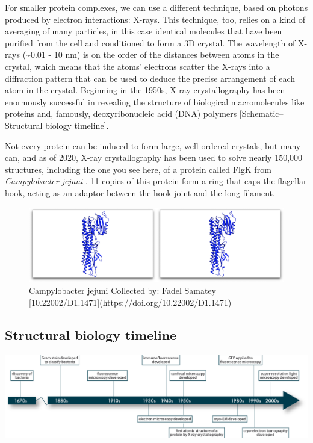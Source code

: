 \documentclass[]{tufte-book}
\begin{document}
For smaller protein complexes, we can use a different technique, based
on photons produced by electron interactions: X-rays. This technique,
too, relies on a kind of averaging of many particles, in this case
identical molecules that have been purified from the cell and
conditioned to form a 3D crystal. The wavelength of X-rays
(\textasciitilde{}0.01 - 10 nm) is on the order of the distances between
atoms in the crystal, which means that the atoms' electrons scatter the
X-rays into a diffraction pattern that can be used to deduce the precise
arrangement of each atom in the crystal. Beginning in the 1950s, X-ray
crystallography has been enormously successful in revealing the
structure of biological macromolecules like proteins and, famously,
deoxyribonucleic acid (DNA) polymers {[}Schematic--Structural biology
timeline{]}.

Not every protein can be induced to form large, well-ordered crystals,
but many can, and as of 2020, X-ray crystallography has been used to
solve nearly 150,000 structures, including the one you see here, of a
protein called FlgK from \emph{Campylobacter jejuni}
\citet{bulieris2017}. 11 copies of this protein form a ring that caps
the flagellar hook, acting as an adaptor between the hook joint and the
long filament.

\begin{figure}
\includegraphics{movie_stills/1_9} \caption[Campylobacter jejuni Collected by]{Campylobacter jejuni Collected by: Fadel Samatey [10.22002/D1.1471](https://doi.org/10.22002/D1.1471)}\label{fig:unnamed-chunk-13}
\end{figure}

\subsection{Structural biology
timeline}\label{Structural_biology_timeline}

\includegraphics{img/schematics/1_9_1}
\end{document}
